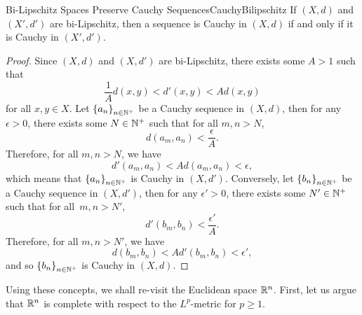 \documentclass[math]{amznotes}
\theoremstyle{remark}
\begin{document}
\begin{probox}{Bi-Lipschitz Spaces Preserve Cauchy Sequences}{CauchyBilipschitz}
    If $\left(X, d\right)$ and $\left(X', d'\right)$ are bi-Lipschitz, then a sequence is Cauchy in $\left(X, d\right)$ if and only if it is Cauchy in $\left(X', d'\right)$.
    \tcblower
    \begin{proof}
        Since $\left(X, d\right)$ and $\left(X, d'\right)$ are bi-Lipschitz, there exists some $A > 1$ such that 
        \begin{equation*}
            \frac{1}{A}d\left(x, y\right) < d'\left(x, y\right) < Ad\left(x, y\right)
        \end{equation*}
        for all $x, y \in X$. Let $\left\{a_n\right\}_{n \in \mathbb{N}^+}$ be a Cauchy sequence in $\left(X, d\right)$, then for any $\epsilon > 0$, there exists some $N \in \mathbb{N}^+$ such that for all $m, n > N$, 
        \begin{equation*}
            d\left(a_m, a_n\right) < \frac{\epsilon}{A}.
        \end{equation*}
        Therefore, for all $m, n > N$, we have 
        \begin{equation*}
            d'\left(a_m, a_n\right) < Ad\left(a_m, a_n\right) < \epsilon,
        \end{equation*}
        which means that $\left\{a_n\right\}_{n \in \mathbb{N}^+}$ is Cauchy in $\left(X, d'\right)$. Conversely, let $\left\{b_n\right\}_{n \in \mathbb{N}^+}$ be a Cauchy sequence in $\left(X, d'\right)$, then for any $\epsilon' > 0$, there exists some $N' \in \mathbb{N}^+$ such that for all~$m, n > N'$, 
        \begin{equation*}
            d'\left(b_m, b_n\right) < \frac{\epsilon'}{A}.
        \end{equation*}
        Therefore, for all $m, n > N'$, we have 
        \begin{equation*}
            d\left(b_m, b_n\right) < Ad'\left(b_m, b_n\right) < \epsilon',
        \end{equation*}
        and so $\left\{b_n\right\}_{n \in \mathbb{N}^+}$ is Cauchy in $\left(X, d\right)$.
    \end{proof}
\end{probox}
Using these concepts, we shall re-visit the Euclidean space $\mathbb{R}^n$. First, let us argue that $\mathbb{R}^n$ is complete with respect to the $L^p$-metric for $p \geq 1$.
\end{document}
